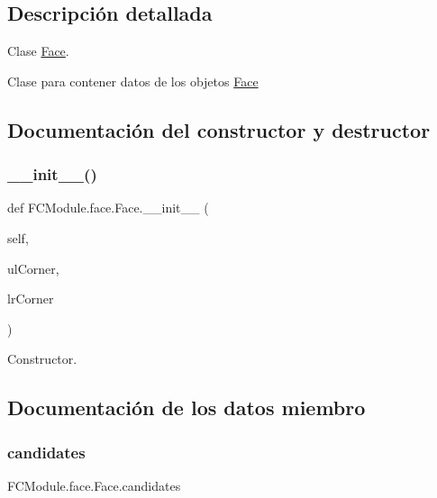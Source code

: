 \subsection{Descripción detallada}
Clase \mbox{\hyperlink{class_f_c_module_1_1face_1_1_face}{Face}}. 

Clase para contener datos de los objetos \mbox{\hyperlink{class_f_c_module_1_1face_1_1_face}{Face}} 

\subsection{Documentación del constructor y destructor}
\mbox{\label{class_f_c_module_1_1face_1_1_face_a5ff0ae73e73bc15b7c92d45f339cd25f}} 
\subsubsection{\texorpdfstring{\+\_\+\+\_\+init\+\_\+\+\_\+()}{\_\_init\_\_()}}
{\footnotesize\ttfamily def F\+C\+Module.\+face.\+Face.\+\_\+\+\_\+init\+\_\+\+\_\+ (\begin{DoxyParamCaption}\item[{}]{self,  }\item[{}]{ul\+Corner,  }\item[{}]{lr\+Corner }\end{DoxyParamCaption})}



Constructor. 



\subsection{Documentación de los datos miembro}
\mbox{\label{class_f_c_module_1_1face_1_1_face_a6b34b10a30cab4dcf7a6117061080c59}} 
\subsubsection{\texorpdfstring{candidates}{candidates}}
{\footnotesize\ttfamily F\+C\+Module.\+face.\+Face.\+candidates}




